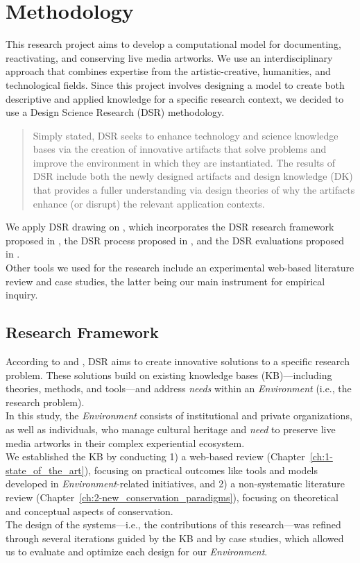 \chapter{\label{ch:0-methodology}Methodology}
This research project aims to develop a computational model for documenting, reactivating, and conserving live media artworks. We use an interdisciplinary approach that combines expertise from the artistic-creative, humanities, and technological fields. Since this project involves designing a model to create both descriptive and applied knowledge for a specific research context, we decided to use a Design Science Research (DSR) methodology.
\begin{quote}
Simply stated, DSR seeks to enhance technology and science knowledge bases via the creation of innovative artifacts that solve problems and improve the environment in which they are instantiated. The results of DSR include both the newly designed artifacts and design knowledge (DK) that provides a fuller understanding via design theories of why the artifacts enhance (or disrupt) the relevant application contexts. \cite{brocke2020introduction}
\end{quote}
We apply DSR drawing on \cite{brocke2020introduction}, which incorporates the DSR research framework proposed in \cite{hevner2004design}, the DSR process proposed in \cite{peffers2007design}, and the DSR evaluations proposed in \cite{sonnenberg2012evaluations}.\\
Other tools we used for the research include an experimental web-based literature review and case studies, the latter being our main instrument for empirical inquiry.

\section{Research Framework}
According to \cite{hevner2004design} and \cite{brocke2020introduction}, DSR aims to create innovative solutions to a specific research problem. These solutions build on existing knowledge bases (KB)—including theories, methods, and tools—and address \textit{needs} within an \textit{Environment} (i.e., the research problem).\\
In this study, the \textit{Environment} consists of institutional and private organizations, as well as individuals, who manage cultural heritage and \textit{need} to preserve live media artworks in their complex experiential ecosystem.\\
We established the KB by conducting 1) a web-based review (Chapter~\ref{ch:1-state_of_the_art}), focusing on practical outcomes like tools and models developed in \textit{Environment}-related initiatives, and 2) a non-systematic literature review (Chapter~\ref{ch:2-new_conservation_paradigms}), focusing on theoretical and conceptual aspects of conservation.\\
The design of the systems—i.e., the contributions of this research—was refined through several iterations guided by the KB and by case studies, which allowed us to evaluate and optimize each design for our \textit{Environment}.

